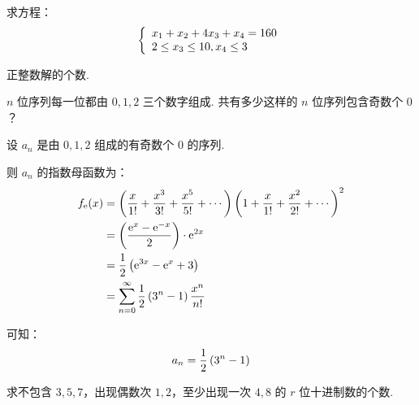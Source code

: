 \documentclass[cn, hazy, blue, normal, 12pt]{elegantnote}
\begin{document}
\begin{exercise}

    求方程：
    \begin{equation}
        \notag
        \left\{\begin{array}{l}
            x_{1}+x_{2}+4 x_{3}+x_{4}=160 \\
            2 \leq x_{3} \leq 10, x_{4} \leq 3
        \end{array}\right.
    \end{equation}

    正整数解的个数.

\end{exercise}

\begin{exercise}

    $n$ 位序列每一位都由 $0, 1, 2$ 三个数字组成. 共有多少这样的 $n$ 位序列包含奇数个 $0$？

\end{exercise}

\begin{solution}[print=true]

    设 $a_n$ 是由 $0, 1, 2$ 组成的有奇数个 $0$ 的序列.

    则 $a_n$ 的指数母函数为：
    \begin{equation}
        \notag
        \begin{aligned}
            f_{\mathrm{e}}(x)
             & = \left(\frac{x}{1!}+\frac{x^3}{3!}+\frac{x^5}{5!}+\cdots\right)
            \left(1+\frac{x}{1!}+\frac{x^2}{2!}+\cdots\right)^2                    \\
             & = \left(\frac{\mathrm{e}^{x}-\mathrm{e}^{-x}}{2}\right) \cdot
            \mathrm{e}^{2x}                                                        \\
             & = \frac{1}{2}\left(\mathrm{e}^{3x}-\mathrm{e}^{x}+3\right)          \\
             & =\sum_{n=0}^{\infty}{\frac{1}{2}\left(3^n - 1\right)\frac{x^n}{n!}}
        \end{aligned}
    \end{equation}

    可知：
    \begin{equation}
        \notag
        a_n = \frac{1}{2}\left(3^n - 1\right)
    \end{equation}

\end{solution}

\begin{exercise}

    求不包含 $3, 5, 7$，出现偶数次 $1, 2$，至少出现一次 $4, 8$ 的 $r$ 位十进制数的个数.

\end{exercise}
\end{document}
